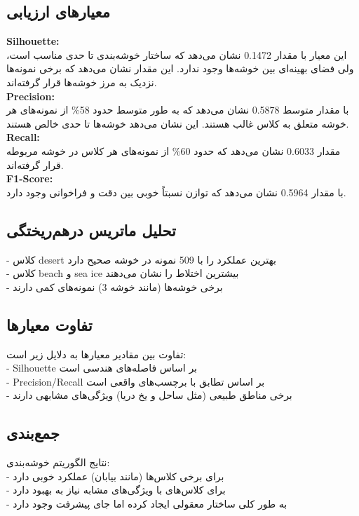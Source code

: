 \documentclass[a4paper,12pt]{article}
\begin{document}
	\subsection*{\textbf{معیارهای ارزیابی}}
	
	\textbf{ Silhouette:}
	\\
	این معیار با مقدار 0.1472 نشان می‌دهد که ساختار خوشه‌بندی تا حدی مناسب است، ولی فضای بهینه‌ای بین خوشه‌ها وجود ندارد. این مقدار نشان می‌دهد که برخی نمونه‌ها نزدیک به مرز خوشه‌ها قرار گرفته‌اند.
	\\
	\textbf{ Precision:}
	\\
	با مقدار متوسط 0.5878 نشان می‌دهد که به طور متوسط حدود 58\% از نمونه‌های هر خوشه متعلق به کلاس غالب هستند. این نشان می‌دهد خوشه‌ها تا حدی خالص هستند.
	\\
	\textbf{Recall:}
	\\
	مقدار 0.6033 نشان می‌دهد که حدود 60\% از نمونه‌های هر کلاس در خوشه مربوطه قرار گرفته‌اند.
	\\
	\textbf{F1-Score:}
	\\
	با مقدار 0.5964 نشان می‌دهد که توازن نسبتاً خوبی بین دقت و فراخوانی وجود دارد.
	
	\subsection*{\textbf{تحلیل ماتریس درهم‌ریختگی}}
	- کلاس desert بهترین عملکرد را با 509 نمونه در خوشه صحیح دارد
	\\
	- کلاس beach و sea ice بیشترین اختلاط را نشان می‌دهند
	\\
	- برخی خوشه‌ها (مانند خوشه 3) نمونه‌های کمی دارند

	
	\subsection*{\textbf{تفاوت معیارها}}
	تفاوت بین مقادیر معیارها به دلایل زیر است:
	\\
	- Silhouette بر اساس فاصله‌های هندسی است
	\\
	- Precision/Recall بر اساس تطابق با برچسب‌های واقعی است
	\\
	- برخی مناطق طبیعی (مثل ساحل و یخ دریا) ویژگی‌های مشابهی دارند
	
	\subsection*{\textbf{جمع‌بندی}}
	نتایج الگوریتم خوشه‌بندی:
	\\
	- برای برخی کلاس‌ها (مانند بیابان) عملکرد خوبی دارد
	\\
	- برای کلاس‌های با ویژگی‌های مشابه نیاز به بهبود دارد
	\\
	- به طور کلی ساختار معقولی ایجاد کرده اما جای پیشرفت وجود دارد
	
\end{document}

